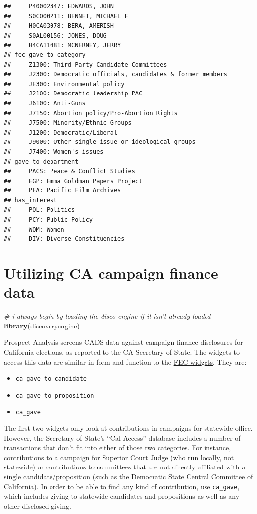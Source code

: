 \documentclass[]{book}
\newenvironment{Shaded}{\begin{snugshade}}{\end{snugshade}}
\newcommand{\CommentTok}[1]{\textcolor[rgb]{0.56,0.35,0.01}{\textit{#1}}}
\newcommand{\KeywordTok}[1]{\textcolor[rgb]{0.13,0.29,0.53}{\textbf{#1}}}
\newcommand{\NormalTok}[1]{#1}
\providecommand{\tightlist}{%
  \setlength{\itemsep}{0pt}\setlength{\parskip}{0pt}}
\begin{document}
\begin{verbatim}
##     P40002347: EDWARDS, JOHN
##     S0CO00211: BENNET, MICHAEL F
##     H0CA03078: BERA, AMERISH
##     S0AL00156: JONES, DOUG
##     H4CA11081: MCNERNEY, JERRY
## fec_gave_to_category 
##     Z1300: Third-Party Candidate Committees
##     J2300: Democratic officials, candidates & former members
##     JE300: Environmental policy
##     J2100: Democratic leadership PAC
##     J6100: Anti-Guns
##     J7150: Abortion policy/Pro-Abortion Rights
##     J7500: Minority/Ethnic Groups
##     J1200: Democratic/Liberal
##     J9000: Other single-issue or ideological groups
##     J7400: Women's issues
## gave_to_department 
##     PACS: Peace & Conflict Studies
##     EGP: Emma Goldman Papers Project
##     PFA: Pacific Film Archives
## has_interest 
##     POL: Politics
##     PCY: Public Policy
##     WOM: Women
##     DIV: Diverse Constituencies
\end{verbatim}

\hypertarget{ex-ca-campaign}{%
\chapter{Utilizing CA campaign finance data}\label{ex-ca-campaign}}

\begin{Shaded}
\begin{Highlighting}[]
\CommentTok{# i always begin by loading the disco engine if it isn't already loaded}
\KeywordTok{library}\NormalTok{(discoveryengine)}
\end{Highlighting}
\end{Shaded}

Prospect Analysis screens CADS data against campaign finance disclosures for California elections, as reported to the CA Secretary of State. The widgets to access this data are similar in form and function to the \protect\hyperlink{ex-fec}{FEC widgets}. They are:

\begin{itemize}
\tightlist
\item
  \texttt{ca\_gave\_to\_candidate}
\item
  \texttt{ca\_gave\_to\_proposition}
\item
  \texttt{ca\_gave}
\end{itemize}

The first two widgets only look at contributions in campaigns for statewide office. However, the Secretary of State's ``Cal Access'' database includes a number of transactions that don't fit into either of those two categories. For instance, contributions to a campaign for Superior Court Judge (who run locally, not statewide) or contributions to committees that are not directly affiliated with a single candidate/proposition (such as the Democratic State Central Committee of California). In order to be able to find any kind of contribution, use \texttt{ca\_gave}, which includes giving to statewide candidates and propositions as well as any other disclosed giving.
\end{document}
